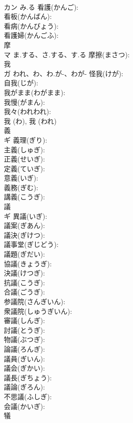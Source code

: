 \documentclass[8pt]{extreport}
\begin{document}
\begin{CJK}{UTF8}{min}
\\	カン	み.る	看護(かんご): 
\\	看板(かんばん): 
\\	看病(かんびょう): 
\\	看護婦(かんごふ): 
\\	摩			
\\	マ	ま.する、さ.する、す.る	摩擦(まさつ): 
\\	我			
\\	ガ	われ、わ、わ.が-、わが-	怪我(けが): 
\\	自我(じが): 
\\	我がまま(わがまま): 
\\	我慢(がまん): 
\\	我々(われわれ): 
\\	我 (わ), 我 (われ)
\\	義			
\\	ギ		義理(ぎり): 
\\	主義(しゅぎ): 
\\	正義(せいぎ): 
\\	定義(ていぎ): 
\\	意義(いぎ): 
\\	義務(ぎむ): 
\\	講義(こうぎ): 
\\	議			
\\	ギ		異議(いぎ): 
\\	議案(ぎあん): 
\\	議決(ぎけつ): 
\\	議事堂(ぎじどう): 
\\	議題(ぎだい): 
\\	協議(きょうぎ): 
\\	決議(けつぎ): 
\\	抗議(こうぎ): 
\\	合議(ごうぎ): 
\\	参議院(さんぎいん): 
\\	衆議院(しゅうぎいん): 
\\	審議(しんぎ): 
\\	討議(とうぎ): 
\\	物議(ぶつぎ): 
\\	論議(ろんぎ): 
\\	議員(ぎいん): 
\\	議会(ぎかい): 
\\	議長(ぎちょう): 
\\	議論(ぎろん): 
\\	不思議(ふしぎ): 
\\	会議(かいぎ): 
\\	犠			

\end{CJK}
\end{document}
